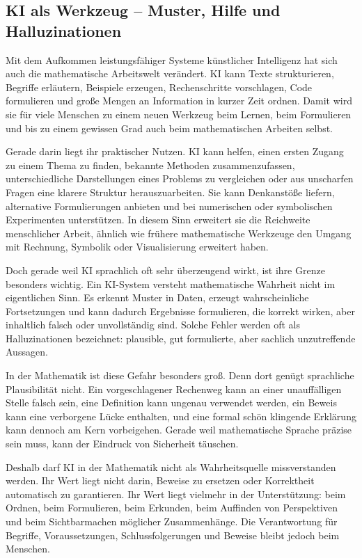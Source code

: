 
\subsection{KI als Werkzeug -- Muster, Hilfe und Halluzinationen}

Mit dem Aufkommen leistungsfähiger Systeme künstlicher Intelligenz hat sich auch die mathematische Arbeitswelt verändert. KI kann Texte strukturieren, Begriffe erläutern, Beispiele erzeugen, Rechenschritte vorschlagen, Code formulieren und große Mengen an Information in kurzer Zeit ordnen. Damit wird sie für viele Menschen zu einem neuen Werkzeug beim Lernen, beim Formulieren und bis zu einem gewissen Grad auch beim mathematischen Arbeiten selbst.

Gerade darin liegt ihr praktischer Nutzen. KI kann helfen, einen ersten Zugang zu einem Thema zu finden, bekannte Methoden zusammenzufassen, unterschiedliche Darstellungen eines Problems zu vergleichen oder aus unscharfen Fragen eine klarere Struktur herauszuarbeiten. Sie kann Denkanstöße liefern, alternative Formulierungen anbieten und bei numerischen oder symbolischen Experimenten unterstützen. In diesem Sinn erweitert sie die Reichweite menschlicher Arbeit, ähnlich wie frühere mathematische Werkzeuge den Umgang mit Rechnung, Symbolik oder Visualisierung erweitert haben.

Doch gerade weil KI sprachlich oft sehr überzeugend wirkt, ist ihre Grenze besonders wichtig. Ein KI-System versteht mathematische Wahrheit nicht im eigentlichen Sinn. Es erkennt Muster in Daten, erzeugt wahrscheinliche Fortsetzungen und kann dadurch Ergebnisse formulieren, die korrekt wirken, aber inhaltlich falsch oder unvollständig sind. Solche Fehler werden oft als Halluzinationen bezeichnet: plausible, gut formulierte, aber sachlich unzutreffende Aussagen.

In der Mathematik ist diese Gefahr besonders groß. Denn dort genügt sprachliche Plausibilität nicht. Ein vorgeschlagener Rechenweg kann an einer unauffälligen Stelle falsch sein, eine Definition kann ungenau verwendet werden, ein Beweis kann eine verborgene Lücke enthalten, und eine formal schön klingende Erklärung kann dennoch am Kern vorbeigehen. Gerade weil mathematische Sprache präzise sein muss, kann der Eindruck von Sicherheit täuschen.

Deshalb darf KI in der Mathematik nicht als Wahrheitsquelle missverstanden werden. Ihr Wert liegt nicht darin, Beweise zu ersetzen oder Korrektheit automatisch zu garantieren. Ihr Wert liegt vielmehr in der Unterstützung: beim Ordnen, beim Formulieren, beim Erkunden, beim Auffinden von Perspektiven und beim Sichtbarmachen möglicher Zusammenhänge. Die Verantwortung für Begriffe, Voraussetzungen, Schlussfolgerungen und Beweise bleibt jedoch beim Menschen.

